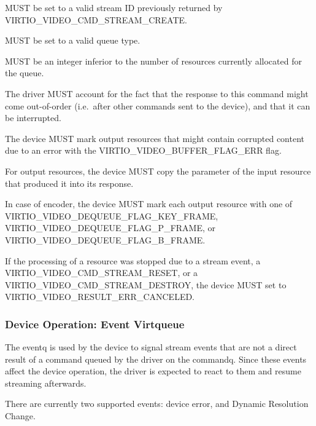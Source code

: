 
 MUST be set to a valid stream ID previously returned
by VIRTIO\_VIDEO\_CMD\_STREAM\_CREATE.

 MUST be set to a valid queue type.

 MUST be an integer inferior to the number of
resources currently allocated for the queue.

The driver MUST account for the fact that the response to this command
might come out-of-order (i.e.~after other commands sent to the device),
and that it can be interrupted.


The device MUST mark output resources that might contain corrupted
content due to an error with the VIRTIO\_VIDEO\_BUFFER\_FLAG\_ERR flag.

For output resources, the device MUST copy the 
parameter of the input resource that produced it into its response.

In case of encoder, the device MUST mark each output resource with one
of VIRTIO\_VIDEO\_DEQUEUE\_FLAG\_KEY\_FRAME,
VIRTIO\_VIDEO\_DEQUEUE\_FLAG\_P\_FRAME, or
VIRTIO\_VIDEO\_DEQUEUE\_FLAG\_B\_FRAME.

If the processing of a resource was stopped due to a stream event, a
VIRTIO\_VIDEO\_CMD\_STREAM\_RESET, or a
VIRTIO\_VIDEO\_CMD\_STREAM\_DESTROY, the device MUST set 
to VIRTIO\_VIDEO\_RESULT\_ERR\_CANCELED.

\subsubsection{Device Operation: Event Virtqueue}\label{sec:Device Types / Video Device / Device Operation / Device Operation: Event Virtqueue}

The eventq is used by the device to signal stream events that are not a
direct result of a command queued by the driver on the commandq. Since
these events affect the device operation, the driver is expected to
react to them and resume streaming afterwards.

There are currently two supported events: device error, and Dynamic
Resolution Change.


